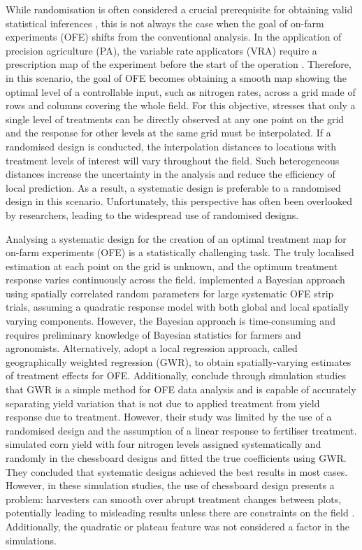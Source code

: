 \documentclass[a4paper]{article} 	%
\begin{document}
While randomisation is often considered a crucial prerequisite for obtaining valid statistical inferences \parencite{Piepho2013Why}, this is not always the case when the goal of on-farm experiments (OFE) shifts from the conventional analysis. In the application of precision agriculture (PA), the variable rate applicators (VRA) require a prescription map of the experiment before the start of the operation \parencite{Pringle2004FieldScale}. Therefore, in this scenario, the goal of OFE becomes obtaining a smooth map showing the optimal level of a controllable input, such as nitrogen rates, across a grid made of rows and columns covering the whole field. For this objective, \textcite{Piepho2011Statistical} stresses that only a single level of treatments can be directly observed at any one point on the grid and the response for other levels at the same grid must be interpolated. If a randomised design is conducted, the interpolation distances to locations with treatment levels of interest will vary throughout the field. Such heterogeneous distances increase the uncertainty in the analysis and reduce the efficiency of local prediction. As a result, a systematic design is preferable to a randomised design in this scenario. Unfortunately, this perspective has often been overlooked by researchers, leading to the widespread use of randomised designs.


Analysing a systematic design for the creation of an optimal treatment map for on-farm experiments (OFE) is a statistically challenging task. The truly localised estimation at each point on the grid is unknown, and the optimum treatment response varies continuously across the field. \textcite{Cao2022Bayesian} implemented a Bayesian approach using spatially correlated random parameters for large systematic OFE strip trials, assuming a quadratic response model with both global and local spatially varying components. However, the Bayesian approach is time-consuming and requires preliminary knowledge of Bayesian statistics for farmers and agronomists. Alternatively, \textcite{Rakshit2020Novel} adopt a local regression approach, called geographically weighted regression (GWR), to obtain spatially-varying estimates of treatment effects for OFE. Additionally, \textcite{Evans2020Assessment} conclude through simulation studies that GWR is a simple method for OFE data analysis and is capable of accurately separating yield variation that is not due to applied treatment from yield response due to treatment. However, their study was limited by the use of a randomised design and the assumption of a linear response to fertiliser treatment. \textcite{Alesso2021Design} simulated corn yield with four nitrogen levels assigned systematically and randomly in the chessboard designs and fitted the true coefficients using GWR. They concluded that systematic designs achieved the best results in most cases. However, in these simulation studies, the use of chessboard design presents a problem: harvesters can smooth over abrupt treatment changes between plots, potentially leading to misleading results unless there are constraints on the field \parencite{Pringle2004FieldScale}. Additionally, the quadratic or plateau feature was not considered a factor in the simulations.
\end{document}
